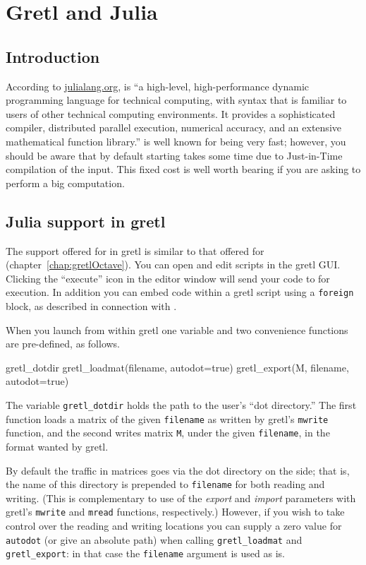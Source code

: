 \chapter{Gretl and Julia}
\label{chap:gretlJulia}

\section{Introduction}
\label{Julia-intro}

According to \url{julialang.org},  is ``a high-level,
high-performance dynamic programming language for technical computing,
with syntax that is familiar to users of other technical computing
environments. It provides a sophisticated compiler, distributed
parallel execution, numerical accuracy, and an extensive mathematical
function library.''  is well known for being very fast;
however, you should be aware that by default starting 
takes some time due to Just-in-Time compilation of the input. This
fixed cost is well worth bearing if you are asking  to
perform a big computation.

\section{Julia support in gretl}
\label{sec:Julia-support}

The support offered for  in gretl is similar to that
offered for  (chapter~\ref{chap:gretlOctave}). You can
open and edit  scripts in the gretl GUI.  Clicking
the ``execute'' icon in the editor window will send your code to
 for execution. In addition you can embed 
code within a gretl script using a \texttt{foreign} block, as
described in connection with .

When you launch  from within gretl one variable and
two convenience functions are pre-defined, as follows.
\begin{code}
gretl_dotdir
gretl_loadmat(filename, autodot=true)
gretl_export(M, filename, autodot=true)
\end{code}
The variable \verb|gretl_dotdir| holds the path to the user's ``dot
directory.''  The first function loads a matrix of the given
\texttt{filename} as written by gretl's \texttt{mwrite}
function, and the second writes matrix \texttt{M}, under the given
\texttt{filename}, in the format wanted by gretl.

By default the traffic in matrices goes via the dot directory on the
 side; that is, the name of this directory is prepended to
\texttt{filename} for both reading and writing. (This is complementary
to use of the \textsl{export} and \textsl{import} parameters with
gretl's \texttt{mwrite} and \texttt{mread} functions, respectively.)
However, if you wish to take control over the reading and writing
locations you can supply a zero value for \texttt{autodot} (or give an
absolute path) when calling \verb|gretl_loadmat| and
\verb|gretl_export|: in that case the \texttt{filename} argument is
used as is.

